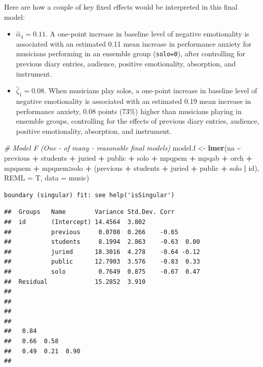 \documentclass[
]{krantz}
\newenvironment{Shaded}{\begin{snugshade}}{\end{snugshade}}
\newcommand{\AttributeTok}[1]{\textcolor[rgb]{0.27,0.27,0.27}{#1}}
\newcommand{\CommentTok}[1]{\textcolor[rgb]{0.37,0.37,0.37}{\textit{#1}}}
\newcommand{\FunctionTok}[1]{\textcolor[rgb]{0.27,0.27,0.27}{\textbf{#1}}}
\newcommand{\NormalTok}[1]{#1}
\newcommand{\OtherTok}[1]{\textcolor[rgb]{0.37,0.37,0.37}{#1}}
\newcommand{\SpecialCharTok}[1]{\textcolor[rgb]{0.43,0.43,0.43}{\textbf{#1}}}
\providecommand{\tightlist}{%
  \setlength{\itemsep}{0pt}\setlength{\parskip}{0pt}}
\begin{document}
Here are how a couple of key fixed effects would be interpreted in this final model:

\begin{itemize}
\tightlist
\item
  \(\hat{\alpha}_{4} = 0.11\). A one-point increase in baseline level of negative emotionality is associated with an estimated 0.11 mean increase in performance anxiety for musicians performing in an ensemble group (\texttt{solo=0}), after controlling for previous diary entries, audience, positive emotionality, absorption, and instrument.
\item
  \(\hat{\zeta}_{1} = 0.08\). When musicians play solos, a one-point increase in baseline level of negative emotionality is associated with an estimated 0.19 mean increase in performance anxiety, 0.08 points (73\%) higher than musicians playing in ensemble groups, controlling for the effects of previous diary entries, audience, positive emotionality, absorption, and instrument.
\end{itemize}

\begin{Shaded}
\begin{Highlighting}[]
\CommentTok{\# Model F (One {-} of many {-} reasonable final models)}
\NormalTok{model.f }\OtherTok{\textless{}{-}} \FunctionTok{lmer}\NormalTok{(na }\SpecialCharTok{\textasciitilde{}}\NormalTok{ previous }\SpecialCharTok{+}\NormalTok{ students }\SpecialCharTok{+}\NormalTok{ juried }\SpecialCharTok{+} 
\NormalTok{    public }\SpecialCharTok{+}\NormalTok{ solo }\SpecialCharTok{+}\NormalTok{ mpqpem }\SpecialCharTok{+}\NormalTok{ mpqab }\SpecialCharTok{+}\NormalTok{ orch }\SpecialCharTok{+}\NormalTok{ mpqnem }\SpecialCharTok{+} 
\NormalTok{    mpqnem}\SpecialCharTok{:}\NormalTok{solo }\SpecialCharTok{+}\NormalTok{ (previous }\SpecialCharTok{+}\NormalTok{ students }\SpecialCharTok{+}\NormalTok{ juried }\SpecialCharTok{+} 
\NormalTok{    public }\SpecialCharTok{+}\NormalTok{ solo }\SpecialCharTok{|}\NormalTok{ id), }\AttributeTok{REML =}\NormalTok{ T, }\AttributeTok{data =}\NormalTok{ music)}
\end{Highlighting}
\end{Shaded}

\begin{verbatim}
boundary (singular) fit: see help('isSingular')
\end{verbatim}

\begin{verbatim}
##  Groups   Name        Variance Std.Dev. Corr       
##  id       (Intercept) 14.4564  3.802               
##           previous     0.0708  0.266    -0.65      
##           students     8.1994  2.863    -0.63  0.00
##           juried      18.3016  4.278    -0.64 -0.12
##           public      12.7903  3.576    -0.83  0.33
##           solo         0.7649  0.875    -0.67  0.47
##  Residual             15.2852  3.910               
##                   
##                   
##                   
##                   
##   0.84            
##   0.66  0.58      
##   0.49  0.21  0.90
## 
\end{verbatim}
\end{document}
